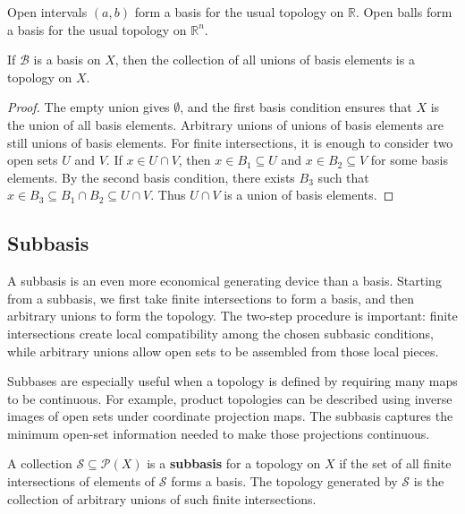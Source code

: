 \begin{example}
Open intervals $(a,b)$ form a basis for the usual topology on $\mathbb{R}$. Open balls form a basis for the usual topology on $\mathbb{R}^n$.
\end{example}

\begin{proposition}
If $\mathcal{B}$ is a basis on $X$, then the collection of all unions of basis elements is a topology on $X$.
\end{proposition}

\begin{proof}
The empty union gives $\emptyset$, and the first basis condition ensures that $X$ is the union of all basis elements. Arbitrary unions of unions of basis elements are still unions of basis elements. For finite intersections, it is enough to consider two open sets $U$ and $V$. If $x\in U\cap V$, then $x\in B_1\subseteq U$ and $x\in B_2\subseteq V$ for some basis elements. By the second basis condition, there exists $B_3$ such that $x\in B_3\subseteq B_1\cap B_2\subseteq U\cap V$. Thus $U\cap V$ is a union of basis elements.
\end{proof}

\subsection{Subbasis}


A subbasis is an even more economical generating device than a basis. Starting from a subbasis, we first take finite intersections to form a basis, and then arbitrary unions to form the topology. The two-step procedure is important: finite intersections create local compatibility among the chosen subbasic conditions, while arbitrary unions allow open sets to be assembled from those local pieces.

Subbases are especially useful when a topology is defined by requiring many maps to be continuous. For example, product topologies can be described using inverse images of open sets under coordinate projection maps. The subbasis captures the minimum open-set information needed to make those projections continuous.

\begin{definition}[Subbasis]
A collection $\mathcal{S}\subseteq\mathcal{P}(X)$ is a \textbf{subbasis} for a topology on $X$ if the set of all finite intersections of elements of $\mathcal{S}$ forms a basis. The topology generated by $\mathcal{S}$ is the collection of arbitrary unions of such finite intersections.
\end{definition}

